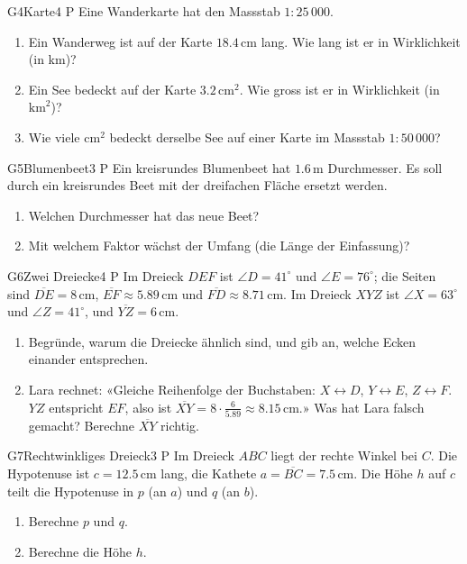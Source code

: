 \documentclass[11pt]{article}
\begin{document}
\begin{lpaufgabe}{G4}{Karte}{4 P}
Eine Wanderkarte hat den Massstab $1 : 25\,000$.
\begin{enumerate}[label=(\alph*),leftmargin=*,itemsep=2pt]
\item Ein Wanderweg ist auf der Karte $18.4\,\text{cm}$ lang. Wie lang ist er in Wirklichkeit (in km)?
\item Ein See bedeckt auf der Karte $3.2\,\text{cm}^2$. Wie gross ist er in Wirklichkeit (in $\text{km}^2$)?
\item Wie viele $\text{cm}^2$ bedeckt derselbe See auf einer Karte im Massstab $1 : 50\,000$?
\end{enumerate}
\end{lpaufgabe}

\begin{lpaufgabe}{G5}{Blumenbeet}{3 P}
Ein kreisrundes Blumenbeet hat $1.6\,\text{m}$ Durchmesser. Es soll durch ein kreisrundes Beet mit der dreifachen Fläche
ersetzt werden.
\begin{enumerate}[label=(\alph*),leftmargin=*,itemsep=2pt]
\item Welchen Durchmesser hat das neue Beet?
\item Mit welchem Faktor wächst der Umfang (die Länge der Einfassung)?
\end{enumerate}
\end{lpaufgabe}

\begin{lpaufgabe}{G6}{Zwei Dreiecke}{4 P}
Im Dreieck $DEF$ ist $\angle D = 41^\circ$ und $\angle E = 76^\circ$; die Seiten sind $\overline{DE} = 8\,\text{cm}$,
$\overline{EF} \approx 5.89\,\text{cm}$ und $\overline{FD} \approx 8.71\,\text{cm}$. Im Dreieck $XYZ$ ist $\angle X = 63^\circ$
und $\angle Z = 41^\circ$, und $\overline{YZ} = 6\,\text{cm}$.
\begin{enumerate}[label=(\alph*),leftmargin=*,itemsep=2pt]
\item Begründe, warum die Dreiecke ähnlich sind, und gib an, welche Ecken einander entsprechen.
\item Lara rechnet: «Gleiche Reihenfolge der Buchstaben: $X \leftrightarrow D$, $Y \leftrightarrow E$, $Z \leftrightarrow F$.
  $YZ$ entspricht $EF$, also ist $\overline{XY} = 8 \cdot \tfrac{6}{5.89} \approx 8.15\,\text{cm}$.»
  Was hat Lara falsch gemacht? Berechne $\overline{XY}$ richtig.
\end{enumerate}
\end{lpaufgabe}

\begin{lpaufgabe}{G7}{Rechtwinkliges Dreieck}{3 P}
Im Dreieck $ABC$ liegt der rechte Winkel bei $C$. Die Hypotenuse ist $c = 12.5\,\text{cm}$ lang, die Kathete
$a = \overline{BC} = 7.5\,\text{cm}$. Die Höhe $h$ auf $c$ teilt die Hypotenuse in $p$ (an $a$) und $q$ (an $b$).
\begin{enumerate}[label=(\alph*),leftmargin=*,itemsep=2pt]
\item Berechne $p$ und $q$.
\item Berechne die Höhe $h$.
\end{enumerate}
\end{lpaufgabe}
\end{document}
